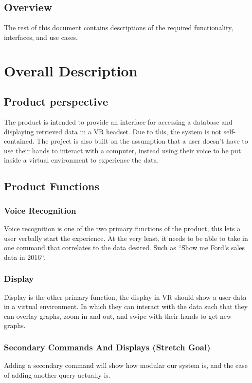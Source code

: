 \documentclass[onecolumn, draftclsnofoot,10pt, compsoc]{IEEEtran}
\begin{document}
    \subsection{Overview}
        The rest of this document contains descriptions of the required functionality, interfaces, and use cases.
    \section{Overall Description}

    \subsection{Product perspective}
        The product is intended to provide an interface for accessing a database and displaying retrieved data in a VR headset. Due to this, the system is not self-contained. The project is also built on the assumption that a user doesn’t have to use their hands to interact with a computer, instead using their voice to be put inside a virtual environment to experience the data.

    \subsection{Product Functions}

        \subsubsection{Voice Recognition}
            Voice recognition is one of the two primary functions of the product, this lets a user verbally start the experience. At the very least, it needs to be able to take in one command that correlates to the data desired. Such as ``Show me Ford’s sales data in 2016``.

        \subsubsection{Display}
            Display is the other primary function, the display in VR should show a user data in a virtual environment. In which they can interact with the data such that they can overlay graphs, zoom in and out, and swipe with their hands to get new graphs.

        \subsubsection{Secondary Commands And Displays (Stretch Goal)}
            Adding a secondary command will show how modular our system is, and the ease of adding another query actually is.
\end{document}
